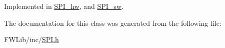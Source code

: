 Implemented in \hyperlink{class_s_p_i__hw_ac7ad2285241535b622899ca2c4e4b706}{SPI\_\-hw}, and \hyperlink{class_s_p_i__sw_a6ee0c57a75caaa32f222de669ffb3f73}{SPI\_\-sw}.



The documentation for this class was generated from the following file:\begin{DoxyCompactItemize}
\item 
FWLib/inc/\hyperlink{_s_p_i_8h}{SPI.h}\end{DoxyCompactItemize}
